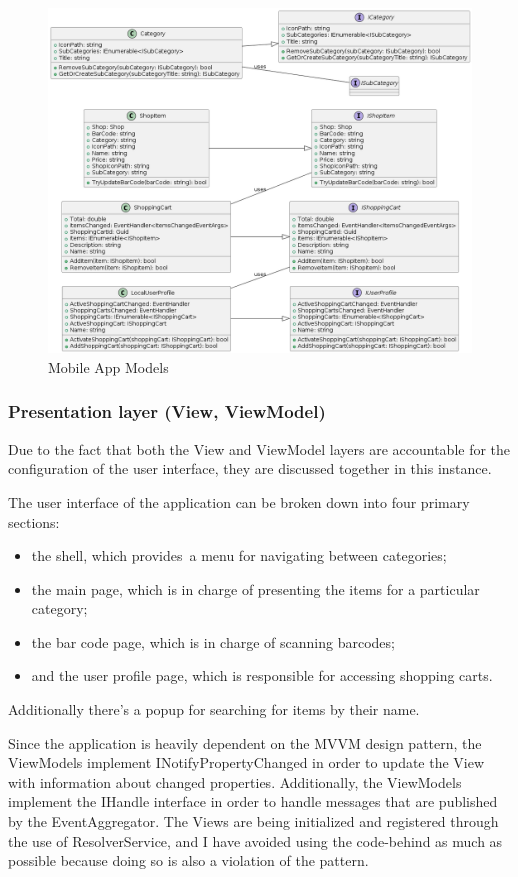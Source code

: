 \begin{figure}[H]
	\centering
	\includegraphics[width=1\linewidth]{img/app_models.png}
	\caption{Mobile App Models}
	\label{fig:appmodels}
\end{figure}

\subsubsection{Presentation layer (View, ViewModel)}

Due to the fact that both the View and ViewModel layers are accountable for the configuration of the user interface, they are discussed together in this instance. 

The user interface of the application can be broken down into four primary sections: \begin{itemize}
	\item the shell, which provides a menu for navigating between categories;
	\item the main page, which is in charge of presenting the items for a particular category;
	\item the bar code page, which is in charge of scanning barcodes;
	\item  and the user profile page, which is responsible for accessing shopping carts.
\end{itemize} 
Additionally there's a popup for searching for items by their name.

Since the application is heavily dependent on the MVVM design pattern, the ViewModels implement INotifyPropertyChanged in order to update the View with information about changed properties. Additionally, the ViewModels implement the IHandle interface in order to handle messages that are published by the EventAggregator. The Views are being initialized and registered through the use of ResolverService, and I have avoided using the code-behind as much as possible because doing so is also a violation of the pattern.

